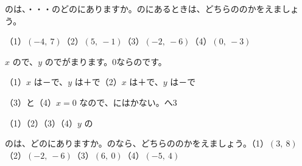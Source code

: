 \begin{reidai}[どの\R{区画}{く|かく}にある？]
のは、・・・のどのにありますか。のにあるときは、どちらののかをえましょう。\par
（1）$(-4,\ 7)$\quad（2）$(5,\ -1)$\quad（3）$(-2,\ -6)$\quad（4）$(0,\ -3)$\par
\kangaekata $x$ ので、$y$ のでがまります。0ならのです。\par
\shiki（1）\nobreak $x$ は－で、$y$ は＋で\quad（2）\nobreak $x$ は＋で、$y$ は－で\par
\hspace*{2.6\zw}（3）\nobreak {}と\quad（4）\nobreak $x=0$ なので、にはかない。へ3\par
\kotae（1）\nobreak {}\quad（2）\nobreak {}\quad（3）\nobreak {}\quad（4）\nobreak $y$ の
\end{reidai}

\begin{jibun}
のは、どのにありますか。のなら、どちらののかをえましょう。（1）$(3,\ 8)$（2）$(-2,\ -6)$（3）$(6,\ 0)$（4）$(-5,\ 4)$
\end{jibun}

